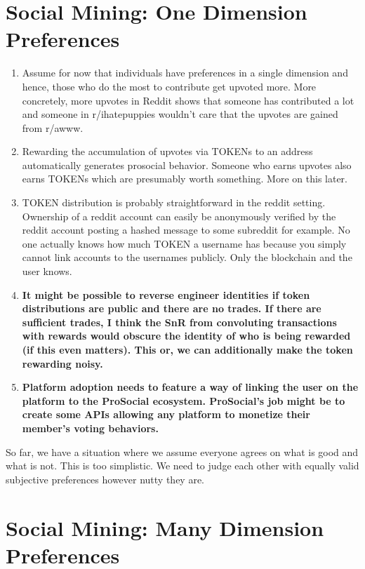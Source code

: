 \section*{Social Mining: One Dimension Preferences}

\begin{enumerate}
	\item Assume for now that individuals have preferences in a single dimension and hence, those who do the most to contribute get upvoted more. More concretely, more upvotes in Reddit shows that someone has contributed a lot and someone in r/ihatepuppies wouldn't care that the upvotes are gained from r/awww.
	
	\item Rewarding the accumulation of upvotes via TOKENs to an address automatically generates prosocial behavior. Someone who earns upvotes also earns TOKENs which are presumably worth something. More on this later.
	
	\item TOKEN distribution is probably straightforward in the reddit setting. Ownership of a reddit account can easily be anonymously verified by the reddit account posting a hashed message to some subreddit for example. No one actually knows how much TOKEN a username has because you simply cannot link accounts to the usernames publicly. Only the blockchain and the user knows. 
	
	\item \textbf{It might be possible to reverse engineer identities if token distributions are public and there are no trades. If there are sufficient trades, I think the SnR from convoluting transactions with rewards would obscure the identity of who is being rewarded (if this even matters). This or, we can additionally make the token rewarding noisy.} 
	
	\item \textbf{Platform adoption needs to feature a way of linking the user on the platform to the ProSocial ecosystem. ProSocial's job might be to create some APIs allowing any platform to monetize their member's voting behaviors.}
	
\end{enumerate}

So far, we have a situation where we assume everyone agrees on what is good and what is not. This is too simplistic. We need to judge each other with equally valid subjective preferences however nutty they are.

\section*{Social Mining: Many Dimension Preferences}

